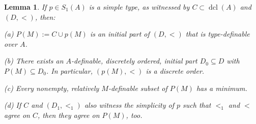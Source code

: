 \documentclass[10pt,a4paper]{amsart}
\newtheorem{Lemma}[Theorem]{Lemma}
\theoremstyle{definition}
\DeclareMathOperator{\dcl}{dcl}
\begin{document}
\begin{Lemma}\label{Lemma_basic_simple}
If   $p\in S_1(A)$ is a simple type, as witnessed by $C\subset\dcl(A)$ and $(D,<)$, then:

(a) $P(M):=C\cup p(M)$ is an initial part  of $(D,<)$ that is type-definable over $A$.

(b) There exists an  $A$-definable, discretely ordered, initial part $D_0\subseteq D$  with $P(M)\subseteq D_0$. In particular, $(p(M),<)$ is a discrete order.  

(c) Every nonempty, relatively $M$-definable subset of  $P(M)$ has a  minimum.  

(d) If $C$ and $(D_1,<_1)$ also witness the simplicity of $p$ such that $<_1$ and $<$ agree on $C$, then they agree on $P(M)$, too. 
\end{Lemma}
\end{document}
